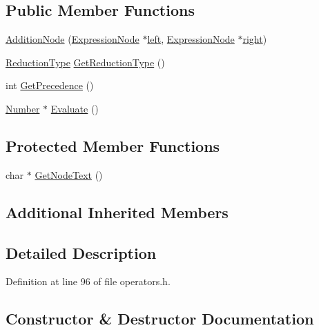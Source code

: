 \subsection*{Public Member Functions}
\begin{DoxyCompactItemize}
\item 
\hyperlink{classAdditionNode_ad887731026da63e83069e3c5a282b02d}{Addition\+Node} (\hyperlink{classExpressionNode}{Expression\+Node} $\ast$\hyperlink{classNumericOperator_a55da3c4075408deff978711030fa8258}{left}, \hyperlink{classExpressionNode}{Expression\+Node} $\ast$\hyperlink{classNumericOperator_aa2c5b5bea59bbb068bc6013bc5cac483}{right})
\item 
\hyperlink{nodes_8h_ab321a69ad5704b704b8dd9e1b3984a29}{Reduction\+Type} \hyperlink{classAdditionNode_a0e397ee6a3a4c8936e6c5a366c030dee}{Get\+Reduction\+Type} ()
\item 
int \hyperlink{classAdditionNode_a2e3b68052c4160597a34966b5654ab4b}{Get\+Precedence} ()
\item 
\hyperlink{structNumber}{Number} $\ast$ \hyperlink{classAdditionNode_a670d80d50ea6f8d1e38855de7130a503}{Evaluate} ()
\end{DoxyCompactItemize}
\subsection*{Protected Member Functions}
\begin{DoxyCompactItemize}
\item 
char $\ast$ \hyperlink{classAdditionNode_acae67b14a0db5b1e972968fa9d00f906}{Get\+Node\+Text} ()
\end{DoxyCompactItemize}
\subsection*{Additional Inherited Members}


\subsection{Detailed Description}


Definition at line 96 of file operators.\+h.



\subsection{Constructor \& Destructor Documentation}
